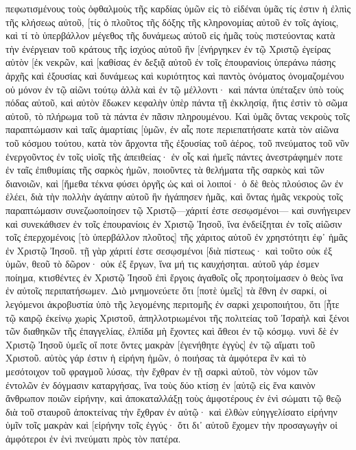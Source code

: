 πεφωτισμένους τοὺς ὀφθαλμοὺς τῆς καρδίας ὑμῶν εἰς τὸ εἰδέναι ὑμᾶς τίς ἐστιν ἡ ἐλπὶς τῆς κλήσεως αὐτοῦ, [τίς ὁ πλοῦτος τῆς δόξης τῆς κληρονομίας αὐτοῦ ἐν τοῖς ἁγίοις, 
καὶ τί τὸ ὑπερβάλλον μέγεθος τῆς δυνάμεως αὐτοῦ εἰς ἡμᾶς τοὺς πιστεύοντας κατὰ τὴν ἐνέργειαν τοῦ κράτους τῆς ἰσχύος αὐτοῦ 
ἣν [ἐνήργηκεν ἐν τῷ Χριστῷ ἐγείρας αὐτὸν [ἐκ νεκρῶν, καὶ [καθίσας ἐν δεξιᾷ αὐτοῦ ἐν τοῖς ἐπουρανίοις 
ὑπεράνω πάσης ἀρχῆς καὶ ἐξουσίας καὶ δυνάμεως καὶ κυριότητος καὶ παντὸς ὀνόματος ὀνομαζομένου οὐ μόνον ἐν τῷ αἰῶνι τούτῳ ἀλλὰ καὶ ἐν τῷ μέλλοντι· 
καὶ πάντα ὑπέταξεν ὑπὸ τοὺς πόδας αὐτοῦ, καὶ αὐτὸν ἔδωκεν κεφαλὴν ὑπὲρ πάντα τῇ ἐκκλησίᾳ, 
ἥτις ἐστὶν τὸ σῶμα αὐτοῦ, τὸ πλήρωμα τοῦ τὰ πάντα ἐν πᾶσιν πληρουμένου. 
Καὶ ὑμᾶς ὄντας νεκροὺς τοῖς παραπτώμασιν καὶ ταῖς ἁμαρτίαις [ὑμῶν, 
ἐν αἷς ποτε περιεπατήσατε κατὰ τὸν αἰῶνα τοῦ κόσμου τούτου, κατὰ τὸν ἄρχοντα τῆς ἐξουσίας τοῦ ἀέρος, τοῦ πνεύματος τοῦ νῦν ἐνεργοῦντος ἐν τοῖς υἱοῖς τῆς ἀπειθείας· 
ἐν οἷς καὶ ἡμεῖς πάντες ἀνεστράφημέν ποτε ἐν ταῖς ἐπιθυμίαις τῆς σαρκὸς ἡμῶν, ποιοῦντες τὰ θελήματα τῆς σαρκὸς καὶ τῶν διανοιῶν, καὶ [ἤμεθα τέκνα φύσει ὀργῆς ὡς καὶ οἱ λοιποί· 
ὁ δὲ θεὸς πλούσιος ὢν ἐν ἐλέει, διὰ τὴν πολλὴν ἀγάπην αὐτοῦ ἣν ἠγάπησεν ἡμᾶς, 
καὶ ὄντας ἡμᾶς νεκροὺς τοῖς παραπτώμασιν συνεζωοποίησεν τῷ Χριστῷ—χάριτί ἐστε σεσῳσμένοι— 
καὶ συνήγειρεν καὶ συνεκάθισεν ἐν τοῖς ἐπουρανίοις ἐν Χριστῷ Ἰησοῦ, 
ἵνα ἐνδείξηται ἐν τοῖς αἰῶσιν τοῖς ἐπερχομένοις [τὸ ὑπερβάλλον πλοῦτος] τῆς χάριτος αὐτοῦ ἐν χρηστότητι ἐφ᾽ ἡμᾶς ἐν Χριστῷ Ἰησοῦ. 
τῇ γὰρ χάριτί ἐστε σεσῳσμένοι [διὰ πίστεως· καὶ τοῦτο οὐκ ἐξ ὑμῶν, θεοῦ τὸ δῶρον· 
οὐκ ἐξ ἔργων, ἵνα μή τις καυχήσηται. 
αὐτοῦ γάρ ἐσμεν ποίημα, κτισθέντες ἐν Χριστῷ Ἰησοῦ ἐπὶ ἔργοις ἀγαθοῖς οἷς προητοίμασεν ὁ θεὸς ἵνα ἐν αὐτοῖς περιπατήσωμεν. 
Διὸ μνημονεύετε ὅτι [ποτὲ ὑμεῖς] τὰ ἔθνη ἐν σαρκί, οἱ λεγόμενοι ἀκροβυστία ὑπὸ τῆς λεγομένης περιτομῆς ἐν σαρκὶ χειροποιήτου, 
ὅτι [ἦτε τῷ καιρῷ ἐκείνῳ χωρὶς Χριστοῦ, ἀπηλλοτριωμένοι τῆς πολιτείας τοῦ Ἰσραὴλ καὶ ξένοι τῶν διαθηκῶν τῆς ἐπαγγελίας, ἐλπίδα μὴ ἔχοντες καὶ ἄθεοι ἐν τῷ κόσμῳ. 
νυνὶ δὲ ἐν Χριστῷ Ἰησοῦ ὑμεῖς οἵ ποτε ὄντες μακρὰν [ἐγενήθητε ἐγγὺς] ἐν τῷ αἵματι τοῦ Χριστοῦ. 
αὐτὸς γάρ ἐστιν ἡ εἰρήνη ἡμῶν, ὁ ποιήσας τὰ ἀμφότερα ἓν καὶ τὸ μεσότοιχον τοῦ φραγμοῦ λύσας, τὴν ἔχθραν ἐν τῇ σαρκὶ αὐτοῦ, 
τὸν νόμον τῶν ἐντολῶν ἐν δόγμασιν καταργήσας, ἵνα τοὺς δύο κτίσῃ ἐν [αὑτῷ εἰς ἕνα καινὸν ἄνθρωπον ποιῶν εἰρήνην, 
καὶ ἀποκαταλλάξῃ τοὺς ἀμφοτέρους ἐν ἑνὶ σώματι τῷ θεῷ διὰ τοῦ σταυροῦ ἀποκτείνας τὴν ἔχθραν ἐν αὐτῷ· 
καὶ ἐλθὼν εὐηγγελίσατο εἰρήνην ὑμῖν τοῖς μακρὰν καὶ [εἰρήνην τοῖς ἐγγύς· 
ὅτι δι᾽ αὐτοῦ ἔχομεν τὴν προσαγωγὴν οἱ ἀμφότεροι ἐν ἑνὶ πνεύματι πρὸς τὸν πατέρα. 
